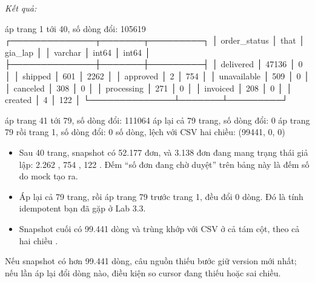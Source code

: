 \textit{Kết quả:}
\begin{codeblock}
áp trang 1 tới 40, số dòng đổi: 105619
┌──────────────┬───────┬─────────┐
│ order_status │ that  │ gia_lap │
│   varchar    │ int64 │  int64  │
├──────────────┼───────┼─────────┤
│ delivered    │ 47136 │       0 │
│ shipped      │   601 │    2262 │
│ approved     │     2 │     754 │
│ unavailable  │   509 │       0 │
│ canceled     │   308 │       0 │
│ processing   │   271 │       0 │
│ invoiced     │   208 │       0 │
│ created      │     4 │     122 │
└──────────────┴───────┴─────────┘

áp trang 41 tới 79, số dòng đổi: 111064
áp lại cả 79 trang, số dòng đổi: 0
áp trang 79 rồi trang 1, số dòng đổi: 0
số dòng, lệch với CSV hai chiều: (99441, 0, 0)
\end{codeblock}

\begin{itemize}
  \item Sau 40 trang, snapshot có 52.177 đơn, và 3.138 đơn đang mang trạng thái giả lập: 2.262 , 754 , 122 . Đếm ``số đơn đang chờ duyệt'' trên bảng này là đếm số do mock tạo ra.
  \item Áp lại cả 79 trang, rồi áp trang 79 trước trang 1, đều đổi 0 dòng. Đó là tính idempotent bạn đã gặp ở Lab 3.3.
  \item Snapshot cuối có 99.441 dòng và trùng khớp với CSV ở cả tám cột, theo cả hai chiều .
\end{itemize}

Nếu snapshot có hơn 99.441 dòng, câu nguồn thiếu bước giữ version mới nhất; nếu lần áp lại đổi dòng nào, điều kiện so cursor đang thiếu hoặc sai chiều.

